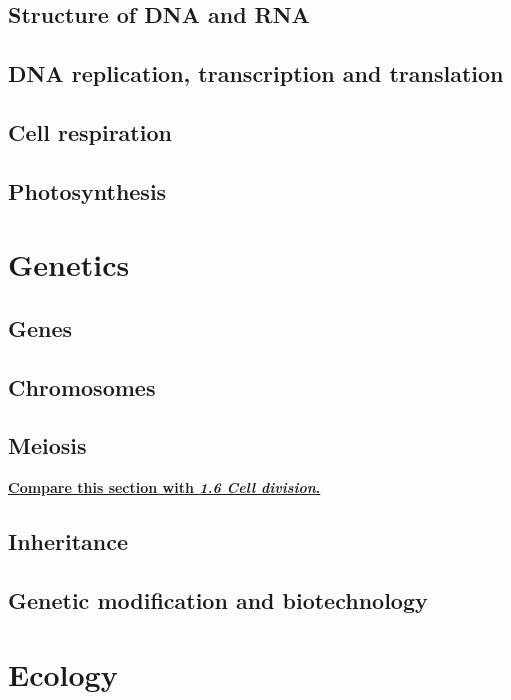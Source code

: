 \documentclass[12pt, a4paper]{article}
\begin{document}
\subsection{Structure of DNA and RNA}

\subsection{DNA replication, transcription and translation}

\subsection{Cell respiration}

\subsection{Photosynthesis}


\newpage
\section{Genetics}
\subsection{Genes}

\subsection{Chromosomes}

\subsection{Meiosis}\label{B}
\hyperref[A]{\textbf{Compare this section with \textit{1.6 Cell division}.}}


\subsection{Inheritance}

\subsection{Genetic modification and biotechnology}


\newpage
\section{Ecology}
\end{document}
